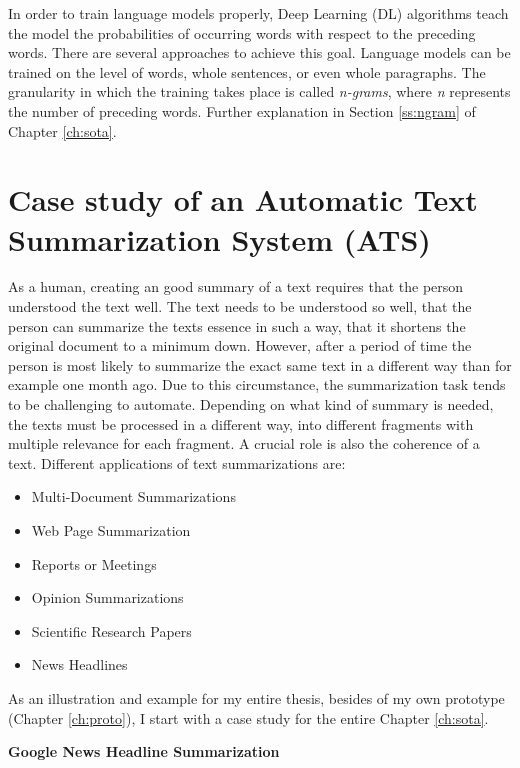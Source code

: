 In order to train language models properly, Deep Learning (DL) algorithms teach the model the probabilities of occurring words with respect to the preceding words. There are several approaches to achieve this goal. Language models can be trained on the level of words, whole sentences, or even whole paragraphs. The granularity in which the training takes place is called \textit{n-grams}, where \textit{n} represents the number of preceding words. Further explanation in Section \ref{ss:ngram} of Chapter \ref{ch:sota}. 


\section{Case study of an Automatic Text Summarization System (ATS)}

As a human, creating an good summary of a text requires that the person understood the text well. The text needs to be understood so well, that the person can summarize the texts essence in such a way, that it shortens the original document to a minimum down. However, after a period of time the person is most likely to summarize the exact same text in a different way than for example one month ago. Due to this circumstance, the summarization task tends to be challenging to automate. Depending on what kind of summary is needed, the texts must be processed in a different way, into different fragments with multiple relevance for each fragment. A crucial role is also the coherence of a text. Different applications of text summarizations are:

\begin{itemize}
	\item Multi-Document Summarizations
	\item Web Page Summarization
	\item Reports or Meetings
	\item Opinion Summarizations
	\item Scientific Research Papers
	\item News Headlines
\end{itemize}

As an illustration and example for my entire thesis, besides of my own prototype (Chapter \ref{ch:proto}), I start with a case study for the entire Chapter \ref{ch:sota}. 

\textbf{Google News Headline Summarization}

